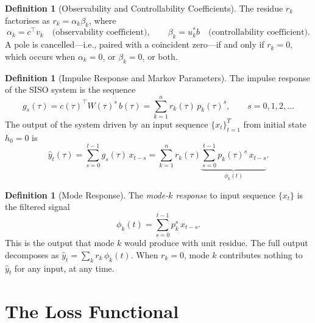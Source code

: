 \documentclass[11pt,a4paper]{article}
\theoremstyle{definition}
\newtheorem{definition}[theorem]{Definition}
\begin{document}
\begin{definition}[Observability and Controllability Coefficients]%
\label{def:obs_ctrl}
The residue $r_k$ factorises as $r_k = \alpha_k \beta_k$, where
\begin{equation}\label{eq:alpha_beta}
  \alpha_k = c^{\top} v_k \quad
  \text{(observability coefficient)}, \qquad
  \beta_k = u_k^* b \quad
  \text{(controllability coefficient)}.
\end{equation}
A pole is cancelled---i.e., paired with a coincident zero---if and
only if $r_k = 0$, which occurs when $\alpha_k = 0$, or
$\beta_k = 0$, or both.
\end{definition}

\begin{definition}[Impulse Response and Markov Parameters]\label{def:impulse}
The impulse response of the SISO system is the sequence
\begin{equation}\label{eq:impulse}
  g_s(\tau) = c(\tau)^{\top} W(\tau)^s\, b(\tau)
  = \sum_{k=1}^n r_k(\tau)\, p_k(\tau)^s,
  \qquad s = 0, 1, 2, \ldots
\end{equation}
The output of the system driven by an input sequence
$\{x_t\}_{t=1}^T$ from initial state $h_0 = 0$ is
\begin{equation}\label{eq:convolution}
  \hat{y}_t(\tau) = \sum_{s=0}^{t-1} g_s(\tau)\, x_{t-s}
  = \sum_{k=1}^n r_k(\tau) \underbrace{
    \sum_{s=0}^{t-1} p_k(\tau)^s\, x_{t-s}
  }_{\displaystyle \phi_k(t)}.
\end{equation}
\end{definition}

\begin{definition}[Mode Response]\label{def:mode_response}
The \emph{mode-$k$ response} to input sequence $\{x_t\}$ is the
filtered signal
\begin{equation}\label{eq:mode_response}
  \phi_k(t) = \sum_{s=0}^{t-1} p_k^s\, x_{t-s}.
\end{equation}
This is the output that mode $k$ would produce with unit residue.
The full output decomposes as
$\hat{y}_t = \sum_k r_k\, \phi_k(t)$.
When $r_k = 0$, mode $k$ contributes nothing to $\hat{y}_t$ for
any input, at any time.
\end{definition}

\section{The Loss Functional}\label{sec:loss}
\end{document}
